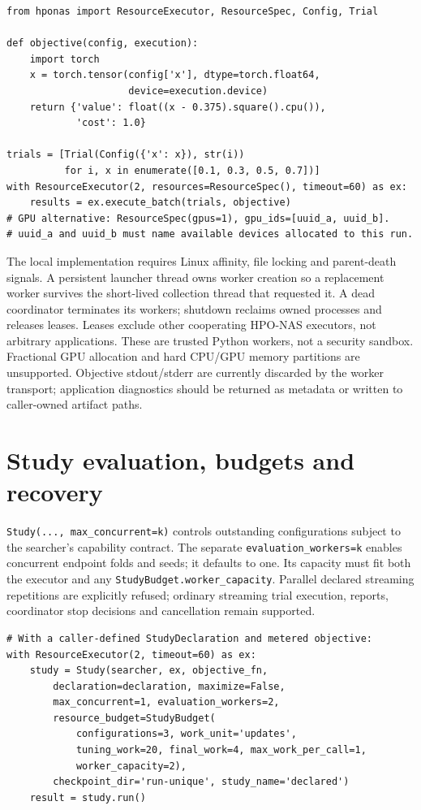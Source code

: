 \begin{Verbatim}[fontsize=\small]
from hponas import ResourceExecutor, ResourceSpec, Config, Trial

def objective(config, execution):
    import torch
    x = torch.tensor(config['x'], dtype=torch.float64,
                     device=execution.device)
    return {'value': float((x - 0.375).square().cpu()),
            'cost': 1.0}

trials = [Trial(Config({'x': x}), str(i))
          for i, x in enumerate([0.1, 0.3, 0.5, 0.7])]
with ResourceExecutor(2, resources=ResourceSpec(), timeout=60) as ex:
    results = ex.execute_batch(trials, objective)
# GPU alternative: ResourceSpec(gpus=1), gpu_ids=[uuid_a, uuid_b].
# uuid_a and uuid_b must name available devices allocated to this run.
\end{Verbatim}

The local implementation requires Linux affinity, file locking and parent-death
signals. A persistent launcher thread owns worker creation so a replacement
worker survives the short-lived collection thread that requested it. A dead
coordinator terminates its workers; shutdown reclaims owned processes and
releases leases. Leases exclude other cooperating HPO-NAS executors, not
arbitrary applications. These are trusted Python workers, not a security
sandbox. Fractional GPU allocation and hard CPU/GPU memory partitions are
unsupported. Objective stdout/stderr are currently discarded by the worker
transport; application diagnostics should be returned as metadata or written
to caller-owned artifact paths.

\section{Study evaluation, budgets and recovery}
\texttt{Study(..., max\_concurrent=k)} controls outstanding configurations
subject to the searcher's capability contract. The separate
\texttt{evaluation\_workers=k} enables concurrent endpoint folds and seeds;
it defaults to one. Its capacity must fit both the executor and any
\texttt{StudyBudget.worker\_capacity}. Parallel declared streaming repetitions
are explicitly refused; ordinary streaming trial execution, reports,
coordinator stop decisions and cancellation remain supported.

\begin{Verbatim}[fontsize=\small]
# With a caller-defined StudyDeclaration and metered objective:
with ResourceExecutor(2, timeout=60) as ex:
    study = Study(searcher, ex, objective_fn,
        declaration=declaration, maximize=False,
        max_concurrent=1, evaluation_workers=2,
        resource_budget=StudyBudget(
            configurations=3, work_unit='updates',
            tuning_work=20, final_work=4, max_work_per_call=1,
            worker_capacity=2),
        checkpoint_dir='run-unique', study_name='declared')
    result = study.run()
\end{Verbatim}

